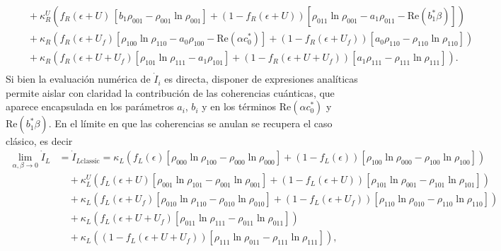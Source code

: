 \begin{appendixs}
\begin{align*}
      &\quad + \kappa^{U}_{R}\!\left(f_{R}(\epsilon + U)\,[b_{1} \rho_{001} - \rho_{001}\ln \rho_{001}] + (1-f_{R}(\epsilon + U))[\rho_{011}\ln \rho_{001} -a_{1}\rho_{011} - \mathrm{Re}(b^{*}_{1}\beta )] \right) \\  
      &\quad + \kappa_{R}\!\left( f_{R}(\epsilon + U_{f})[\rho_{100}\ln \rho_{110} -a_{0}\rho_{100} - \mathrm{Re}(\alpha c^{*}_{0})]  + (1-f_{R}(\epsilon + U_{f}))[a_{0}\rho_{110} - \rho_{110}\ln \rho_{110}] \right) \\  
      &\quad + \kappa_{R}\!\left( f_{R}(\epsilon + U + U_{f})[\rho_{101}\ln \rho_{111}- a_{1}\rho_{101}] + (1-f_{R}(\epsilon+U+U_{f}) )[a_{1}\rho_{111} - \rho_{111}\ln \rho_{111}] \right). \\
\end{align*}
Si bien la evaluación numérica de $\dot{I}_{i}$ es directa, disponer de expresiones analíticas permite aislar con claridad la contribución de las coherencias cuánticas, que aparece encapsulada en los parámetros $a_i$, $b_i$ y en los términos $\mathrm{Re}(\alpha c_0^*)$ y $\mathrm{Re}(b_1^* \beta)$. En el límite en que las coherencias se anulan se recupera el caso clásico, es decir
\begin{align*}
 \lim_{\alpha,\beta \to 0}\dot{I}_{L}  &= \dot{I}_{L\text{classic}}   =
 \kappa_{L}\!\left(f_{L}(\epsilon)[\rho_{000}\ln \rho_{100} - \rho_{000}\ln \rho_{000}] + (1-f_{L}(\epsilon))[\rho_{100}\ln \rho_{000} - \rho_{100}\ln \rho_{100}] \right)  \\ 
      &\quad + \kappa^{U}_{L}\!\left(f_{L}(\epsilon + U)[\rho_{001}\ln \rho_{101} - \rho_{001}\ln \rho_{001}] + (1-f_{L}(\epsilon + U))[\rho_{101}\ln \rho_{001} -\rho_{101}\ln \rho_{101}] \right) \\  
      &\quad + \kappa_{L}\!\left( f_{L}(\epsilon + U_{f})[\rho_{010}\ln \rho_{110} -\rho_{010}\ln \rho_{010}] + (1-f_{L}(\epsilon + U_{f}))[\rho_{110}\ln \rho_{010} - \rho_{110}\ln \rho_{110}] \right) \\  
      &\quad + \kappa_{L}\!\left( f_{L}(\epsilon + U + U_{f})[\rho_{011}\ln \rho_{111}- \rho_{011}\ln \rho_{011}] \right) \\
      & \quad + \kappa_{L}\!\left( (1-f_{L}(\epsilon+U+U_{f}))[\rho_{111}\ln \rho_{011} - \rho_{111}\ln \rho_{111}] \right),
    \end{align*}


\end{appendixs}
